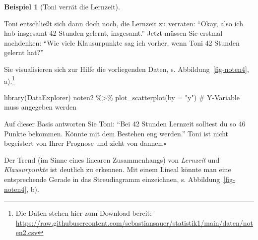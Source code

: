 \documentclass[
  a4paper,
]{scrbook}
\newenvironment{Shaded}{\begin{snugshade}}{\end{snugshade}}
\newcommand{\AttributeTok}[1]{\textcolor[rgb]{0.40,0.45,0.13}{#1}}
\newcommand{\CommentTok}[1]{\textcolor[rgb]{0.37,0.37,0.37}{#1}}
\newcommand{\FunctionTok}[1]{\textcolor[rgb]{0.28,0.35,0.67}{#1}}
\newcommand{\NormalTok}[1]{\textcolor[rgb]{0.00,0.23,0.31}{#1}}
\newcommand{\SpecialCharTok}[1]{\textcolor[rgb]{0.37,0.37,0.37}{#1}}
\newcommand{\StringTok}[1]{\textcolor[rgb]{0.13,0.47,0.30}{#1}}
\theoremstyle{definition}
\newtheorem{example}{Beispiel}[chapter]
\theoremstyle{definition}
\theoremstyle{definition}
\theoremstyle{remark}
\begin{document}
\begin{example}[Toni verrät die
Lernzeit]\protect\hypertarget{exm-noten3}{}\label{exm-noten3}

Toni entschließt sich dann doch noch, die Lernzeit zu verraten: ``Okay,
also ich hab insgesamt 42 Stunden gelernt, insgesamt.'' Jetzt müssen Sie
erstmal nachdenken: ``Wie viele Klausurpunkte sag ich vorher, wenn Toni
42 Stunden gelernt hat?''

Sie visualisieren sich zur Hilfe die vorliegenden Daten, s.
Abbildung~\ref{fig-noten4}, a).\footnote{Die Daten stehen hier zum
  Download bereit:
  \url{https://raw.githubusercontent.com/sebastiansauer/statistik1/main/daten/noten2.csv}}

\begin{Shaded}
\begin{Highlighting}[]
\FunctionTok{library}\NormalTok{(DataExplorer)}
\NormalTok{noten2 }\SpecialCharTok{\%\textgreater{}\%} 
  \FunctionTok{plot\_scatterplot}\NormalTok{(}\AttributeTok{by =} \StringTok{"y"}\NormalTok{)  }\CommentTok{\# Y{-}Variable muss angegeben werden}
\end{Highlighting}
\end{Shaded}

Auf dieser Basis antworten Sie Toni: ``Bei 42 Stunden Lernzeit solltest
du so 46 Punkte bekommen. Könnte mit dem Bestehen eng werden.'' Toni ist
nicht begeistert von Ihrer Prognose und zieht von dannen.\(\square\)

\end{example}

Der Trend (im Sinne eines linearen Zusammenhangs) von \emph{Lernzeit}
und \emph{Klausurpunkte} ist deutlich zu erkennen. Mit einem Lineal
könnte man eine entsprechende Gerade in das Streudiagramm einzeichnen,
s. Abbildung~\ref{fig-noten4}, b).
\end{document}
